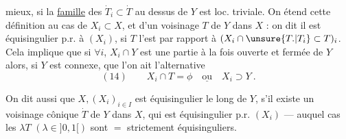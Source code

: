 mieux, si la \uline{famille} des $\dot T_i\subset\dot T$ au dessus
de $Y$ est  loc. triviale. On étend cette
définition au cas de $X_i\subset X$, et d'un
voisinage  $T$ de $Y$ dans $X$ : on dit
il est équisingulier p.r. à $(X_i)$, si $T$
l'est par rapport à $(X_i\cap\unsure{T.|T_i}\subset T)_i$. Cela
implique que si $\forall i$, $X_i\cap Y$ est une
partie à la fois ouverte et fermée de $Y$
alors, si $Y$ est connexe, que  l'on ait
l'alternative
\[
(14)\qquad X_i\cap T=\phi\quad\underline{\text{ou}}\quad X_i\supset Y\ .
\]
\margin{Si $T$ équisingulier p.r. à $(X_i)$,
$\lambda T$ l'est strictement pour $\lambda\in]0,1[$.}

On dit aussi que $X,(X_i)_{i\in I}$ est
 équisingulier
le long de $Y$, s'il existe un voisinage cônique
 $\dot T$ de $Y$ dans $X$, qui est équisingulier
p.r.  $(X_i)$ --- auquel cas les $\lambda T$
$(\lambda\in]0,1[)$ sont $=$ strictement équisinguliers.
